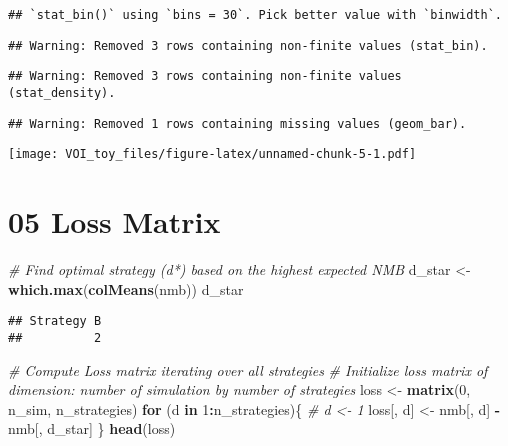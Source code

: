 \documentclass[
]{article}
\newenvironment{Shaded}{\begin{snugshade}}{\end{snugshade}}
\newcommand{\CommentTok}[1]{\textcolor[rgb]{0.56,0.35,0.01}{\textit{#1}}}
\newcommand{\ControlFlowTok}[1]{\textcolor[rgb]{0.13,0.29,0.53}{\textbf{#1}}}
\newcommand{\DecValTok}[1]{\textcolor[rgb]{0.00,0.00,0.81}{#1}}
\newcommand{\KeywordTok}[1]{\textcolor[rgb]{0.13,0.29,0.53}{\textbf{#1}}}
\newcommand{\NormalTok}[1]{#1}
\newcommand{\OperatorTok}[1]{\textcolor[rgb]{0.81,0.36,0.00}{\textbf{#1}}}
\newcommand{\StringTok}[1]{\textcolor[rgb]{0.31,0.60,0.02}{#1}}
\begin{document}
\begin{verbatim}
## `stat_bin()` using `bins = 30`. Pick better value with `binwidth`.
\end{verbatim}

\begin{verbatim}
## Warning: Removed 3 rows containing non-finite values (stat_bin).
\end{verbatim}

\begin{verbatim}
## Warning: Removed 3 rows containing non-finite values (stat_density).
\end{verbatim}

\begin{verbatim}
## Warning: Removed 1 rows containing missing values (geom_bar).
\end{verbatim}

\texttt{[image: VOI\_toy\_files/figure-latex/unnamed-chunk-5-1.pdf]}

\hypertarget{loss-matrix}{%
\section{05 Loss Matrix}\label{loss-matrix}}

\begin{Shaded}
\begin{Highlighting}[]
\CommentTok{# Find optimal strategy (d*) based on the highest expected NMB}
\NormalTok{d_star <-}\StringTok{ }\KeywordTok{which.max}\NormalTok{(}\KeywordTok{colMeans}\NormalTok{(nmb))}
\NormalTok{d_star}
\end{Highlighting}
\end{Shaded}

\begin{verbatim}
## Strategy B 
##          2
\end{verbatim}

\begin{Shaded}
\begin{Highlighting}[]
\CommentTok{# Compute Loss matrix iterating over all strategies}
\CommentTok{# Initialize loss matrix of dimension: number of simulation by number of strategies}
\NormalTok{loss <-}\StringTok{ }\KeywordTok{matrix}\NormalTok{(}\DecValTok{0}\NormalTok{, n_sim, n_strategies)}
\ControlFlowTok{for}\NormalTok{ (d }\ControlFlowTok{in} \DecValTok{1}\OperatorTok{:}\NormalTok{n_strategies)\{ }\CommentTok{# d <- 1}
\NormalTok{  loss[, d] <-}\StringTok{ }\NormalTok{nmb[, d] }\OperatorTok{-}\StringTok{ }\NormalTok{nmb[, d_star]}
\NormalTok{\}}
\KeywordTok{head}\NormalTok{(loss)}
\end{Highlighting}
\end{Shaded}
\end{document}
